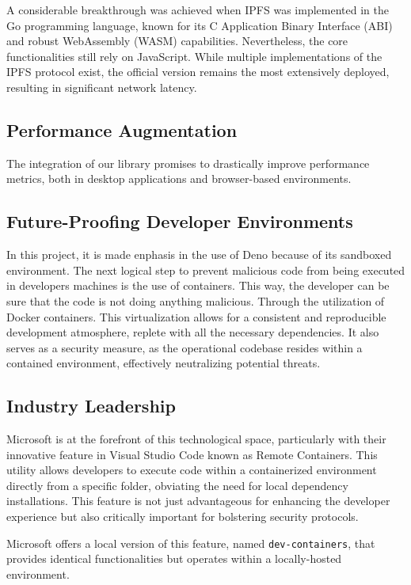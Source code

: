 \documentclass[10pt,journal,compsoc]{IEEEtran}
\begin{document}
A considerable breakthrough was achieved when IPFS was implemented in the Go programming language, known for its C Application Binary Interface (ABI) and robust WebAssembly (WASM) capabilities. Nevertheless, the core functionalities still rely on JavaScript. While multiple implementations of the IPFS protocol exist, the official version remains the most extensively deployed, resulting in significant network latency.

\subsection{Performance Augmentation}

The integration of our library promises to drastically improve performance metrics, both in desktop applications and browser-based environments.

\subsection{Future-Proofing Developer Environments}

In this project, it is made enphasis in the use of Deno because of its sandboxed environment. The next logical step to prevent malicious code from being executed in developers machines is the use of containers. This way, the developer can be sure that the code is not doing anything malicious. Through the utilization of Docker containers. This virtualization allows for a consistent and reproducible development atmosphere, replete with all the necessary dependencies. It also serves as a security measure, as the operational codebase resides within a contained environment, effectively neutralizing potential threats.

\subsection{Industry Leadership}

Microsoft is at the forefront of this technological space, particularly with their innovative feature in Visual Studio Code known as Remote Containers. This utility allows developers to execute code within a containerized environment directly from a specific folder, obviating the need for local dependency installations. This feature is not just advantageous for enhancing the developer experience but also critically important for bolstering security protocols.

Microsoft offers a local version of this feature, named \verb|dev-containers|, that provides identical functionalities but operates within a locally-hosted environment.
\end{document}
